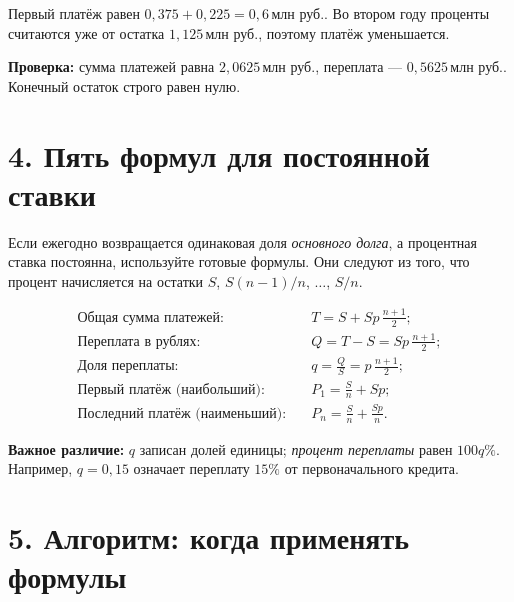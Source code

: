 \documentclass[a4paper,12pt]{article}
\newcommand{\key}[1]{\textcolor{darkaccent}{\textbf{#1}}}
\newcommand{\mln}{\,\text{млн руб.}}
\begin{document}
Первый платёж равен $0{,}375+0{,}225=0{,}6\mln$. Во втором году проценты считаются уже от остатка $1{,}125\mln$, поэтому платёж уменьшается.

\key{Проверка:} сумма платежей равна $2{,}0625\mln$, переплата --- $0{,}5625\mln$. Конечный остаток строго равен нулю.

\section*{4. Пять формул для постоянной ставки}

Если ежегодно возвращается одинаковая доля \emph{основного долга}, а процентная ставка постоянна, используйте готовые формулы. Они следуют из того, что процент начисляется на остатки $S$, $S(n-1)/n$, $\ldots$, $S/n$.

\begin{align*}
\text{Общая сумма платежей:}\quad & T=S+Sp\,\frac{n+1}{2};\\[4pt]
\text{Переплата в рублях:}\quad & Q=T-S=Sp\,\frac{n+1}{2};\\[4pt]
\text{Доля переплаты:}\quad & q=\frac{Q}{S}=p\,\frac{n+1}{2};\\[4pt]
\text{Первый платёж (наибольший):}\quad & P_1=\frac Sn+Sp;\\[4pt]
\text{Последний платёж (наименьший):}\quad & P_n=\frac Sn+\frac{Sp}{n}.
\end{align*}

\key{Важное различие:} $q$ записан долей единицы; \emph{процент переплаты} равен $100q\%$. Например, $q=0{,}15$ означает переплату $15\%$ от первоначального кредита.

\clearpage
\section*{5. Алгоритм: когда применять формулы}
\end{document}
